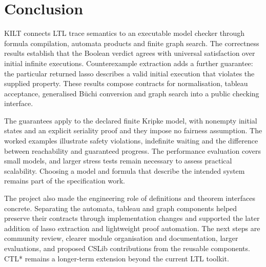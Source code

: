 \section{Conclusion}\label{sec:conclusion}

KILT connects LTL trace semantics to an executable model checker through
formula compilation, automata products and finite graph search. The
correctness results establish that the Boolean verdict agrees with universal
satisfaction over initial infinite executions. Counterexample extraction adds
a further guarantee: the particular returned lasso describes a valid initial
execution that violates the supplied property. These results compose contracts
for normalisation, tableau acceptance, generalised B\"uchi conversion and graph
search into a public checking interface.

The guarantees apply to the declared finite Kripke model, with nonempty
initial states and an explicit seriality proof and they impose no fairness
assumption. The worked examples illustrate safety violations, indefinite
waiting and the difference between reachability and guaranteed progress.
The performance evaluation covers small models, and larger stress tests
remain necessary to assess practical scalability. Choosing a model and
formula that describe the intended system remains part of the specification
work.

The project also made the engineering role of definitions and theorem
interfaces concrete. Separating the automata, tableau and graph components
helped preserve their contracts through implementation changes and supported
the later addition of lasso extraction and lightweight proof automation.
The next steps are community review, clearer module organisation and
documentation, larger evaluations, and proposed CSLib contributions from
the reusable components. CTL* remains a longer-term extension beyond the
current LTL toolkit.
